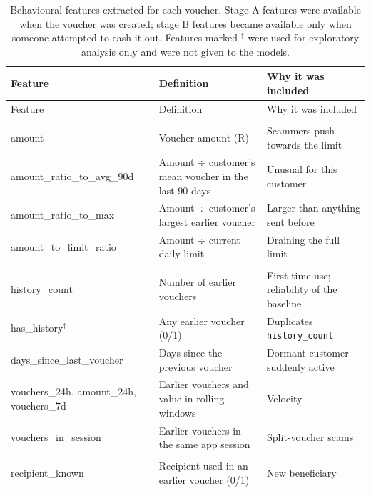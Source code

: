 \begingroup
\setlength\LTcapwidth{\textwidth}
\footnotesize
\begin{xltabular}{\textwidth}{>{\ttfamily\raggedright\arraybackslash}p{0.31\textwidth} >{\raggedright\arraybackslash}X >{\raggedright\arraybackslash}X}
\caption{Behavioural features extracted for each voucher. Stage A features were available when the voucher was created; stage B features became available only when someone attempted to cash it out. Features marked $^\dagger$ were used for exploratory analysis only and were not given to the models.}\label{tab:features} \\
\toprule
\normalfont Feature & Definition & Why it was included \\
\midrule
\endfirsthead
\toprule
\normalfont Feature & Definition & Why it was included \\
\midrule
\endhead
\bottomrule
\endfoot
{}\\
amount & Voucher amount (R) & Scammers push towards the limit \\
amount\_ratio\_to\_avg\_90d & Amount $\div$ customer's mean voucher in the last 90 days & Unusual for this customer \\
amount\_ratio\_to\_max & Amount $\div$ customer's largest earlier voucher & Larger than anything sent before \\
amount\_to\_limit\_ratio & Amount $\div$ current daily limit & Draining the full limit \\
\\
history\_count & Number of earlier vouchers & First-time use; reliability of the baseline \\
has\_history$^\dagger$ & Any earlier voucher (0/1) & Duplicates \texttt{history\_count} \\
days\_since\_last\_voucher & Days since the previous voucher & Dormant customer suddenly active \\
vouchers\_24h, amount\_24h, vouchers\_7d & Earlier vouchers and value in rolling windows & Velocity \\
vouchers\_in\_session & Earlier vouchers in the same app session & Split-voucher scams \\
\\
recipient\_known & Recipient used in an earlier voucher (0/1) & New beneficiary \\

\end{xltabular}
